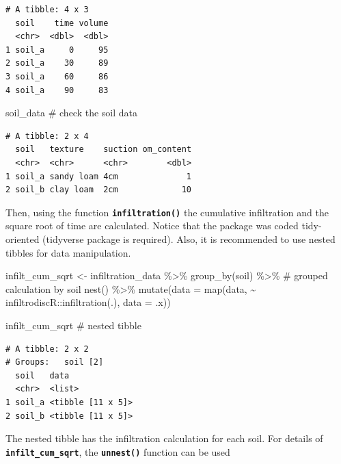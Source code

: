 \documentclass[
]{article}
\newenvironment{Shaded}{\begin{snugshade}}{\end{snugshade}}
\newcommand{\AttributeTok}[1]{\textcolor[rgb]{0.40,0.45,0.13}{#1}}
\newcommand{\CommentTok}[1]{\textcolor[rgb]{0.37,0.37,0.37}{#1}}
\newcommand{\FunctionTok}[1]{\textcolor[rgb]{0.28,0.35,0.67}{#1}}
\newcommand{\NormalTok}[1]{\textcolor[rgb]{0.00,0.23,0.31}{#1}}
\newcommand{\OtherTok}[1]{\textcolor[rgb]{0.00,0.23,0.31}{#1}}
\newcommand{\SpecialCharTok}[1]{\textcolor[rgb]{0.37,0.37,0.37}{#1}}
\begin{document}
\begin{verbatim}
# A tibble: 4 x 3
  soil    time volume
  <chr>  <dbl>  <dbl>
1 soil_a     0     95
2 soil_a    30     89
3 soil_a    60     86
4 soil_a    90     83
\end{verbatim}

\begin{Shaded}
\begin{Highlighting}[]
\NormalTok{soil\_data }\CommentTok{\# check the soil data}
\end{Highlighting}
\end{Shaded}

\begin{verbatim}
# A tibble: 2 x 4
  soil   texture    suction om_content
  <chr>  <chr>      <chr>        <dbl>
1 soil_a sandy loam 4cm              1
2 soil_b clay loam  2cm             10
\end{verbatim}

Then, using the function \textbf{\texttt{infiltration()}} the cumulative
infiltration and the square root of time are calculated. Notice that the
package was coded tidy-oriented (tidyverse package is required). Also,
it is recommended to use nested tibbles for data manipulation.

\begin{Shaded}
\begin{Highlighting}[]
\NormalTok{infilt\_cum\_sqrt }\OtherTok{\textless{}{-}}
\NormalTok{infiltration\_data }\SpecialCharTok{\%\textgreater{}\%} 
\FunctionTok{group\_by}\NormalTok{(soil) }\SpecialCharTok{\%\textgreater{}\%} \CommentTok{\# grouped calculation by soil}
\FunctionTok{nest}\NormalTok{() }\SpecialCharTok{\%\textgreater{}\%} 
\FunctionTok{mutate}\NormalTok{(}\AttributeTok{data =} \FunctionTok{map}\NormalTok{(data, }\SpecialCharTok{\textasciitilde{}}\NormalTok{ infiltrodiscR}\SpecialCharTok{::}\FunctionTok{infiltration}\NormalTok{(.), }\AttributeTok{data =}\NormalTok{ .x)) }

\NormalTok{infilt\_cum\_sqrt }\CommentTok{\# nested tibble}
\end{Highlighting}
\end{Shaded}

\begin{verbatim}
# A tibble: 2 x 2
# Groups:   soil [2]
  soil   data             
  <chr>  <list>           
1 soil_a <tibble [11 x 5]>
2 soil_b <tibble [11 x 5]>
\end{verbatim}

The nested tibble has the infiltration calculation for each soil. For
details of \textbf{\texttt{infilt\_cum\_sqrt}}, the
\textbf{\texttt{unnest()}} function can be used
\end{document}
